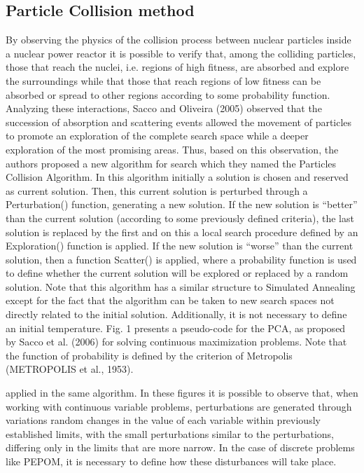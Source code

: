\subsection{Particle Collision method}
\label{sec:PC}

By observing the physics of the collision process between nuclear particles inside a nuclear power reactor it is possible to verify that, among the colliding particles, those that reach the nuclei, i.e. regions of high fitness, are absorbed and explore the surroundings while that those that reach regions of low fitness can be absorbed or spread to other regions according to some probability function. Analyzing these interactions, Sacco and Oliveira (2005) observed that the succession of absorption and scattering events allowed the movement of particles to promote an exploration of the complete search space while a deeper exploration of the most promising areas. Thus, based on this observation, the authors proposed a new algorithm for search which they named the Particles Collision Algorithm. In this algorithm initially a solution is chosen and reserved as current solution. Then, this current solution is perturbed through a Perturbation() function, generating a new solution. If the new solution is “better” than the current solution (according to some previously defined criteria), the last solution is replaced by the first and on this a local search procedure defined by an Exploration() function is applied. If the new solution is “worse” than the current solution, then a function Scatter() is applied, where a probability function is used to define whether the current solution will be explored or replaced by a random solution. Note that this algorithm has a similar structure to Simulated Annealing except for the fact that the algorithm can be taken to new search spaces not directly related to the initial solution. Additionally, it is not necessary to define an initial temperature. Fig. 1 presents a pseudo-code for the PCA, as proposed by Sacco et al. (2006) for solving continuous maximization problems. Note that the function of probability is defined by the criterion of Metropolis (METROPOLIS et al., 1953). 




applied in the same algorithm. In these figures it is possible to observe that, when working with continuous variable problems, perturbations are generated through variations random changes in the value of each variable within previously established limits, with the small perturbations similar to the perturbations, differing only in the limits that are more narrow. In the case of discrete problems like PEPOM, it is necessary to define how these disturbances will take place. 

